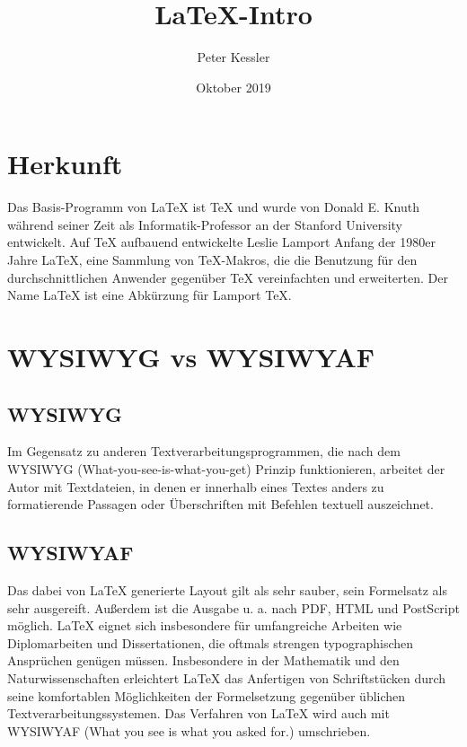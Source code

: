 \documentclass[ 12pt, a4paper, parskip=full]{scrartcl}
\title{\LaTeX-Intro}          %
\author{Peter Kessler}        %
\date{Oktober 2019}           %
\begin{document}
\maketitle

\pagebreak
\tableofcontents

\pagebreak 
\section{Herkunft}

Das Basis-Programm von LaTeX ist TeX und wurde von Donald E. Knuth während seiner Zeit als Informatik-Professor an der Stanford University entwickelt. Auf TeX aufbauend entwickelte Leslie Lamport Anfang der 1980er Jahre LaTeX, eine Sammlung von TeX-Makros, die die Benutzung für den durchschnittlichen Anwender gegenüber TeX vereinfachten und erweiterten. Der Name LaTeX ist eine Abkürzung für Lamport TeX. 

\pagebreak
\section{WYSIWYG vs WYSIWYAF}

\subsection{WYSIWYG}
Im Gegensatz zu anderen Textverarbeitungsprogrammen, die nach dem WYSIWYG (What-you-see-is-what-you-get) Prinzip funktionieren, arbeitet der Autor mit Textdateien, in denen er innerhalb eines Textes anders zu formatierende Passagen oder Überschriften mit Befehlen textuell auszeichnet.

\subsection{WYSIWYAF}
Das dabei von LaTeX generierte Layout gilt als sehr sauber, sein Formelsatz als sehr ausgereift. Außerdem ist die Ausgabe u. a. nach PDF, HTML und PostScript möglich. LaTeX eignet sich insbesondere für umfangreiche Arbeiten wie Diplomarbeiten und Dissertationen, die oftmals strengen typographischen Ansprüchen genügen müssen. Insbesondere in der Mathematik und den Naturwissenschaften erleichtert LaTeX das Anfertigen von Schriftstücken durch seine komfortablen Möglichkeiten der Formelsetzung gegenüber üblichen Textverarbeitungssystemen. Das Verfahren von LaTeX wird auch mit WYSIWYAF (What you see is what you asked for.) umschrieben. 
\end{document}
